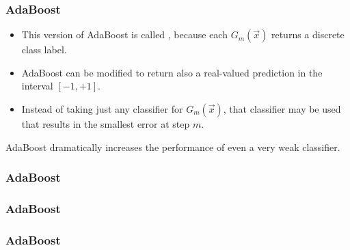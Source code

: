 \begin{frame}
  \frametitle{AdaBoost \cont}


  \begin{itemize}
    \item This version of AdaBoost is called , because each $G_m(\vec x)$ returns a discrete class label. %
    \item AdaBoost can be modified to return also a real-valued prediction in the interval $[-1,+1]$.  %
    \item Instead of taking just any classifier for $G_m(\vec x)$, that classifier may be used that results in the smallest error at step $m$.
  \end{itemize}
  \pspread

  AdaBoost dramatically increases the performance of even a very weak classifier.
\end{frame}


\begin{frame}
  \frametitle{AdaBoost \cont}

%
  \begin{center}
    \resizebox{!}{6.5cm}{
      
    }
  \end{center}
\end{frame}


\begin{frame}
  \frametitle{AdaBoost \cont}


  \begin{center}
  \end{center}
\end{frame}


\begin{frame}
  \frametitle{AdaBoost \cont}

%
  \begin{center}
    \resizebox{!}{6.5cm}{
      
    }
  \end{center}
\end{frame}


